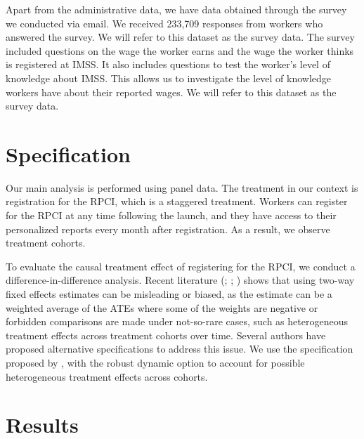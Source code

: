 \documentclass[oneside,11pt]{article}
\begin{document}
Apart from the administrative data, we have data obtained through the survey we conducted via email. We received 233,709 responses from workers who answered the survey. We will refer to this dataset as the survey data. The survey included questions on the wage the worker earns and the wage the worker thinks is registered at IMSS. It also includes questions to test the worker's level of knowledge about IMSS. This allows us to investigate the level of knowledge workers have about their reported wages. We will refer to this dataset as the survey data.

\section{Specification} \label{specification}

Our main analysis is performed using panel data. The treatment in our context is registration for the RPCI, which is a staggered treatment. Workers can register for the RPCI at any time following the launch, and they have access to their personalized reports every month after registration. As a result, we observe treatment cohorts.

To evaluate the causal treatment effect of registering for the RPCI, we conduct a difference-in-difference analysis. Recent literature (\citealt{callaway2021difference}; \citealt{sun2021estimating}; \citealt{de2020two}) shows that using two-way fixed effects estimates can be misleading or biased, as the estimate can be a weighted average of the ATEs where some of the weights are negative or forbidden comparisons are made under not-so-rare cases, such as heterogeneous treatment effects across treatment cohorts over time. Several authors have proposed alternative specifications to address this issue. We use the specification proposed by \cite{de2020two}, with the robust dynamic option to account for possible heterogeneous treatment effects across cohorts.

\section{Results} \label{results}
\end{document}
